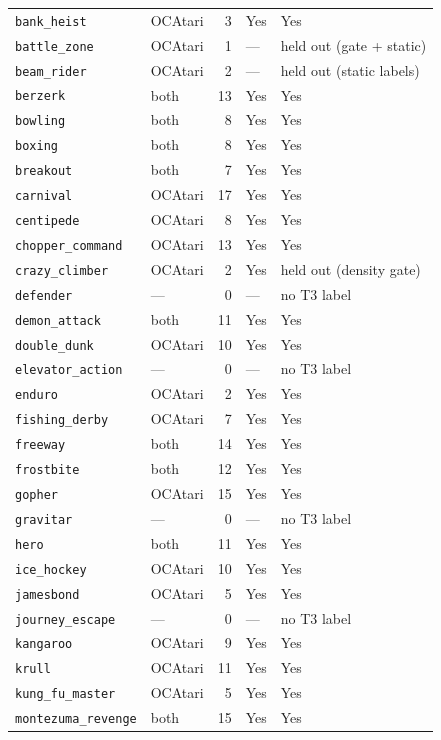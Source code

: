 \begin{longtable}{@{}p{3.2cm}p{1.6cm}r p{1.7cm}p{4.2cm}@{}}
\texttt{bank\_heist} & OCAtari & 3 & Yes & Yes \\
\texttt{battle\_zone} & OCAtari & 1 & --- & held out (gate + static) \\
\texttt{beam\_rider} & OCAtari & 2 & --- & held out (static labels) \\
\texttt{berzerk} & both & 13 & Yes & Yes \\
\texttt{bowling} & both & 8 & Yes & Yes \\
\texttt{boxing} & both & 8 & Yes & Yes \\
\texttt{breakout} & both & 7 & Yes & Yes \\
\texttt{carnival} & OCAtari & 17 & Yes & Yes \\
\texttt{centipede} & OCAtari & 8 & Yes & Yes \\
\texttt{chopper\_command} & OCAtari & 13 & Yes & Yes \\
\texttt{crazy\_climber} & OCAtari & 2 & Yes & held out (density gate) \\
\texttt{defender} & --- & 0 & --- & no T3 label \\
\texttt{demon\_attack} & both & 11 & Yes & Yes \\
\texttt{double\_dunk} & OCAtari & 10 & Yes & Yes \\
\texttt{elevator\_action} & --- & 0 & --- & no T3 label \\
\texttt{enduro} & OCAtari & 2 & Yes & Yes \\
\texttt{fishing\_derby} & OCAtari & 7 & Yes & Yes \\
\texttt{freeway} & both & 14 & Yes & Yes \\
\texttt{frostbite} & both & 12 & Yes & Yes \\
\texttt{gopher} & OCAtari & 15 & Yes & Yes \\
\texttt{gravitar} & --- & 0 & --- & no T3 label \\
\texttt{hero} & both & 11 & Yes & Yes \\
\texttt{ice\_hockey} & OCAtari & 10 & Yes & Yes \\
\texttt{jamesbond} & OCAtari & 5 & Yes & Yes \\
\texttt{journey\_escape} & --- & 0 & --- & no T3 label \\
\texttt{kangaroo} & OCAtari & 9 & Yes & Yes \\
\texttt{krull} & OCAtari & 11 & Yes & Yes \\
\texttt{kung\_fu\_master} & OCAtari & 5 & Yes & Yes \\
\texttt{montezuma\_revenge} & both & 15 & Yes & Yes \\

\end{longtable}
